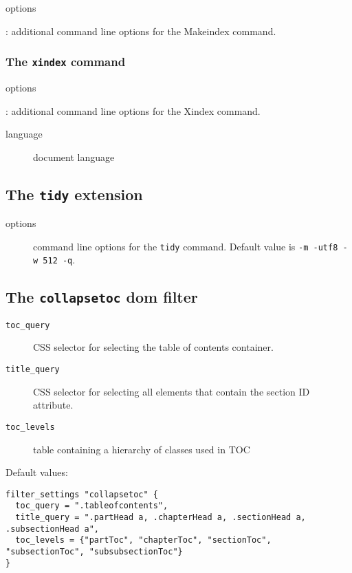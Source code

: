 options

: additional command line options for the Makeindex command.

\hypertarget{the-xindex-command}{%
\subsubsection{\texorpdfstring{The \texttt{xindex}
command}{The xindex command}}\label{the-xindex-command}}

options

: additional command line options for the Xindex command.

\begin{description}
\item[language]
document language
\end{description}

\hypertarget{the-tidy-extension}{%
\subsection{\texorpdfstring{The \texttt{tidy}
extension}{The tidy extension}}\label{the-tidy-extension}}

\begin{description}
\item[options]
command line options for the \texttt{tidy} command. Default value is
\texttt{-m\ -utf8\ -w\ 512\ -q}.
\end{description}

\hypertarget{the-collapsetoc-dom-filter}{%
\subsection{\texorpdfstring{The \texttt{collapsetoc} dom
filter}{The collapsetoc dom filter}}\label{the-collapsetoc-dom-filter}}

\begin{description}
\item[\texttt{toc\_query}]
CSS selector for selecting the table of contents container.
\item[\texttt{title\_query}]
CSS selector for selecting all elements that contain the section ID
attribute.
\item[\texttt{toc\_levels}]
table containing a hierarchy of classes used in TOC
\end{description}

Default values:

\begin{verbatim}
filter_settings "collapsetoc" {
  toc_query = ".tableofcontents",
  title_query = ".partHead a, .chapterHead a, .sectionHead a, .subsectionHead a",
  toc_levels = {"partToc", "chapterToc", "sectionToc", "subsectionToc", "subsubsectionToc"}
}
\end{verbatim}


